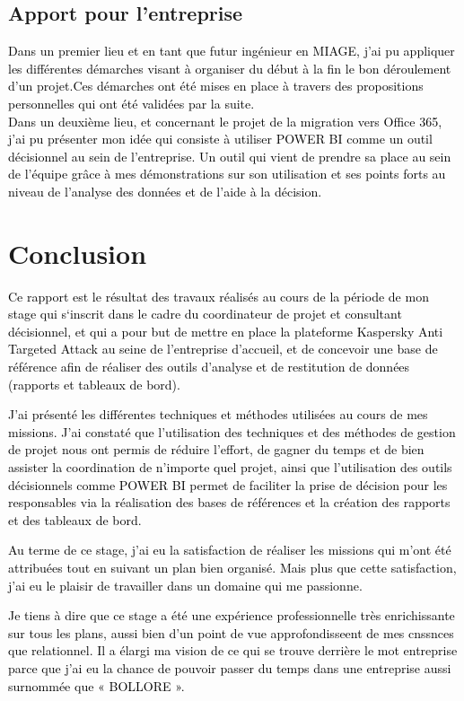 \documentclass[a4paper,12pt]{report}
\begin{document}
\section{Apport pour l’entreprise}

\textcolor{black}{Dans un premier lieu et en tant que futur ingénieur en MIAGE, j’ai pu appliquer les différentes démarches visant à organiser du début à la fin le bon déroulement d'un projet.Ces démarches ont été mises en place à travers des propositions personnelles qui ont été validées par la suite.}
~~\\

\textcolor{black}{Dans un deuxième lieu, et concernant le projet de la migration vers Office 365, j’ai pu présenter mon idée qui consiste à utiliser POWER BI comme un outil décisionnel au sein de l’entreprise. Un outil qui vient de prendre sa place au sein de l’équipe grâce à mes démonstrations sur son utilisation et ses points forts au niveau de l’analyse des données et de l’aide à la décision.}

\chapter{Conclusion }
\textcolor{black}{Ce rapport est le résultat des travaux réalisés au cours de la période de mon stage qui s‘inscrit dans le cadre du coordinateur de projet et consultant décisionnel, et qui a pour but de mettre en place la plateforme Kaspersky Anti Targeted Attack au seine de l’entreprise d’accueil, et de concevoir une base de référence afin de réaliser des outils d’analyse et de restitution de données (rapports et tableaux de bord).}

\textcolor{black}{J’ai présenté les différentes techniques et méthodes utilisées au cours de mes missions. J’ai constaté que l’utilisation des techniques et des méthodes de gestion de projet nous ont permis de réduire l’effort, de gagner du temps et de bien assister la coordination de n’importe quel projet, ainsi que l’utilisation des outils décisionnels comme POWER BI permet de faciliter la prise de décision pour les responsables via la réalisation des bases de références et la création des rapports et des tableaux de bord.}

\textcolor{black}{Au terme de ce stage, j’ai eu la satisfaction de réaliser les missions qui m’ont été attribuées tout en suivant un plan bien organisé. Mais plus que cette satisfaction, j’ai eu le plaisir de travailler dans un domaine qui me passionne.}

\textcolor{black}{Je tiens à dire que ce stage a été une expérience professionnelle très enrichissante sur tous les plans, aussi bien d'un point de vue approfondisseent de mes cnssnces que relationnel.
Il a élargi ma vision de ce qui se trouve derrière le mot entreprise parce que j’ai eu la chance de pouvoir passer du temps dans une entreprise aussi surnommée que « BOLLORE ».}
\end{document}
